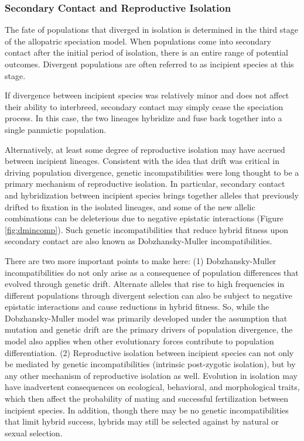 \documentclass[
]{book}
\begin{document}
\hypertarget{secondary-contact-and-reproductive-isolation}{%
\subsubsection*{Secondary Contact and Reproductive Isolation}\label{secondary-contact-and-reproductive-isolation}}

The fate of populations that diverged in isolation is determined in the third stage of the allopatric speciation model. When populations come into secondary contact after the initial period of isolation, there is an entire range of potential outcomes. Divergent populations are often referred to as incipient species at this stage.

If divergence between incipient species was relatively minor and does not affect their ability to interbreed, secondary contact may simply cease the speciation process. In this case, the two lineages hybridize and fuse back together into a single panmictic population.

Alternatively, at least some degree of reproductive isolation may have accrued between incipient lineages. Consistent with the idea that drift was critical in driving population divergence, genetic incompatibilities were long thought to be a primary mechanism of reproductive isolation. In particular, secondary contact and hybridization between incipient species brings together alleles that previously drifted to fixation in the isolated lineages, and some of the new allelic combinations can be deleterious due to negative epistatic interactions (Figure \ref{fig:dmincomp}). Such genetic incompatibilities that reduce hybrid fitness upon secondary contact are also known as Dobzhansky-Muller incompatibilities.

There are two more important points to make here: (1) Dobzhansky-Muller incompatibilities do not only arise as a consequence of population differences that evolved through genetic drift. Alternate alleles that rise to high frequencies in different populations through divergent selection can also be subject to negative epistatic interactions and cause reductions in hybrid fitness. So, while the Dobzhansky-Muller model was primarily developed under the assumption that mutation and genetic drift are the primary drivers of population divergence, the model also applies when other evolutionary forces contribute to population differentiation. (2) Reproductive isolation between incipient species can not only be mediated by genetic incompatibilities (intrinsic post-zygotic isolation), but by any other mechanism of reproductive isolation as well. Evolution in isolation may have inadvertent consequences on ecological, behavioral, and morphological traits, which then affect the probability of mating and successful fertilization between incipient species. In addition, though there may be no genetic incompatibilities that limit hybrid success, hybrids may still be selected against by natural or sexual selection.
\end{document}
